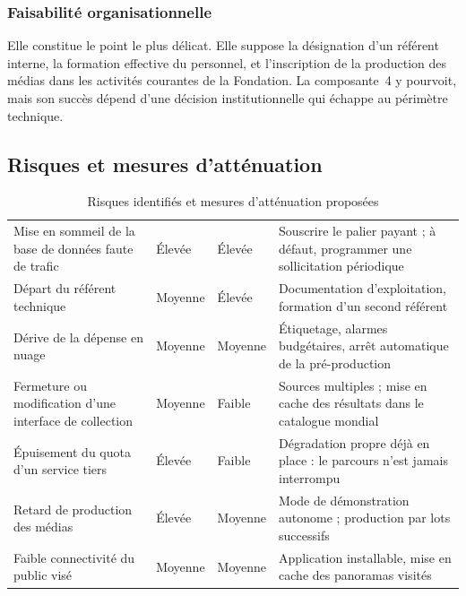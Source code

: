 \subsubsection{Faisabilité organisationnelle}

Elle constitue le point le plus délicat. Elle suppose la désignation d'un
référent interne, la formation effective du personnel, et l'inscription de la
production des médias dans les activités courantes de la Fondation. La
composante~4 y pourvoit, mais son succès dépend d'une décision institutionnelle
qui échappe au périmètre technique.

\subsection{Risques et mesures d'atténuation}

\begin{table}[htbp]
\centering
\caption{Risques identifiés et mesures d'atténuation proposées}
\label{tab:risques}
\small
\begin{tabularx}{\textwidth}{|L{3.7cm}|C{2.1cm}|C{1.7cm}|X|}
\hline
{}
 &  &  &  \\ \hline
Mise en sommeil de la base de données faute de trafic & Élevée & Élevée & Souscrire le palier payant ; à défaut, programmer une sollicitation périodique \\ \hline
Départ du référent technique & Moyenne & Élevée & Documentation d'exploitation, formation d'un second référent \\ \hline
Dérive de la dépense en nuage & Moyenne & Moyenne & Étiquetage, alarmes budgétaires, arrêt automatique de la pré-production \\ \hline
Fermeture ou modification d'une interface de collection & Moyenne & Faible & Sources multiples ; mise en cache des résultats dans le catalogue mondial \\ \hline
Épuisement du quota d'un service tiers & Élevée & Faible & Dégradation propre déjà en place : le parcours n'est jamais interrompu \\ \hline
Retard de production des médias & Élevée & Moyenne & Mode de démonstration autonome ; production par lots successifs \\ \hline
Faible connectivité du public visé & Moyenne & Moyenne & Application installable, mise en cache des panoramas visités \\ \hline
\end{tabularx}
\end{table}

